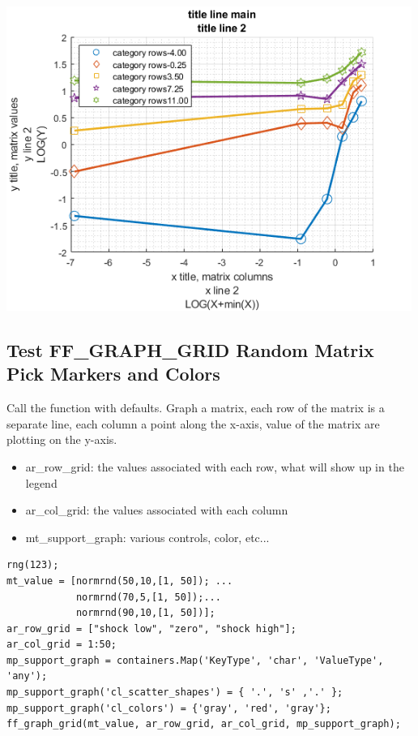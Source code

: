 \documentclass[
]{book}
\begin{document}
\includegraphics[width=5.20833in,height=\textheight]{img/fx_graph_grid_images/figure_1.png}

\hypertarget{test-ff_graph_grid-random-matrix-pick-markers-and-colors}{%
\subsection{Test FF\_GRAPH\_GRID Random Matrix Pick Markers and Colors}\label{test-ff_graph_grid-random-matrix-pick-markers-and-colors}}

Call the function with defaults. Graph a matrix, each row of the matrix
is a separate line, each column a point along the x-axis, value of the
matrix are plotting on the y-axis.

\begin{itemize}
\item
  ar\_row\_grid: the values associated with each row, what will show
  up in the legend
\item
  ar\_col\_grid: the values associated with each column
\item
  mt\_support\_graph: various controls, color, etc...
\end{itemize}

\begin{verbatim}
rng(123);
mt_value = [normrnd(50,10,[1, 50]); ...
            normrnd(70,5,[1, 50]);...
            normrnd(90,10,[1, 50])];
ar_row_grid = ["shock low", "zero", "shock high"];
ar_col_grid = 1:50;
mp_support_graph = containers.Map('KeyType', 'char', 'ValueType', 'any');
mp_support_graph('cl_scatter_shapes') = { '.', 's' ,'.' };
mp_support_graph('cl_colors') = {'gray', 'red', 'gray'};
ff_graph_grid(mt_value, ar_row_grid, ar_col_grid, mp_support_graph);
\end{verbatim}
\end{document}
